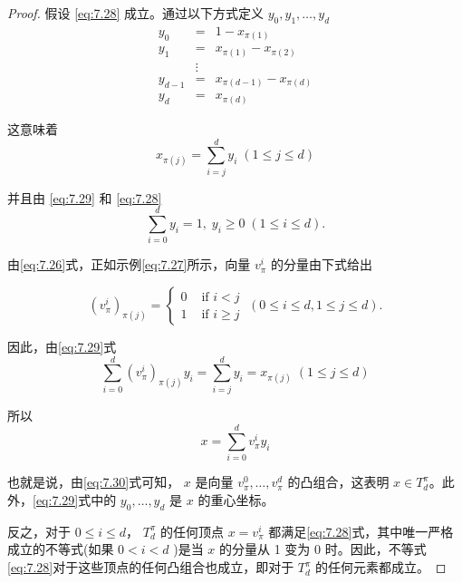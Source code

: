 \begin{proof}
假设 \eqref{eq:7.28} 成立。通过以下方式定义 \({y}_{0},{y}_{1},\ldots,{y}_{d}\)
\begin{eqnarray}
{y}_{0} &=& 1 - {x}_{\pi \left( 1\right) }\nonumber\\
{y}_{1}& =& {x}_{\pi \left( 1\right) } - {x}_{\pi \left( 2\right) }\nonumber\\
&\vdots&\label{eq:7.29}\\
{y}_{d - 1} &=& {x}_{\pi \left( {d - 1}\right) } - {x}_{\pi \left( d\right) }\nonumber\\
{y}_{d} &=& {x}_{\pi \left( d\right) }\nonumber
\end{eqnarray}

这意味着
\[
{x}_{\pi \left( j\right) } = \mathop{\sum }\limits_{{i = j}}^{d}{y}_{i}\;\left( {1 \leq  j \leq  d}\right)
\]

并且由 \eqref{eq:7.29} 和 \eqref{eq:7.28}
\begin{equation}
\mathop{\sum }\limits_{{i = 0}}^{d}{y}_{i} = 1,\;{y}_{i} \geq  0\;\left( {1 \leq  i \leq  d}\right) .\label{eq:7.30}
\end{equation}

由\eqref{eq:7.26}式，正如示例\eqref{eq:7.27}所示，向量 \({v}_{\pi }^{i}\) 的分量由下式给出

\[
{\left( {v}_{\pi }^{i}\right) }_{\pi \left( j\right) } = \left\{  {\begin{array}{ll} 0 & \text{ if }i < j \\  1 & \text{ if }i \geq  j \end{array}\;\left( {0 \leq  i \leq  d,1 \leq  j \leq  d}\right) .}\right.
\]

因此，由\eqref{eq:7.29}式
\[
\mathop{\sum }\limits_{{i = 0}}^{d}{\left( {v}_{\pi }^{i}\right) }_{\pi \left( j\right) }{y}_{i} = \mathop{\sum }\limits_{{i = j}}^{d}{y}_{i} = {x}_{\pi \left( j\right) }\;\left( {1 \leq  j \leq  d}\right)
\]

所以
\begin{equation}
x = \mathop{\sum }\limits_{{i = 0}}^{d}{v}_{\pi }^{i}{y}_{i}\label{eq:7.31}
\end{equation}

也就是说，由\eqref{eq:7.30}式可知， \(x\) 是向量 \({v}_{\pi }^{0},\ldots,{v}_{\pi }^{d}\) 的凸组合，这表明 \(x \in  {T}_{d}^{\pi }\)。此外，\eqref{eq:7.29}式中的 \({y}_{0},\ldots,{y}_{d}\) 是 \(x\) 的重心坐标。

反之，对于 \(0 \leq  i \leq  d\)， \({T}_{d}^{\pi }\) 的任何顶点 \(x = {v}_{\pi }^{i}\) 都满足\eqref{eq:7.28}式，其中唯一严格成立的不等式(如果 \(0 < i < d\) )是当 \(x\) 的分量从 1 变为 0 时。因此，不等式\eqref{eq:7.28}对于这些顶点的任何凸组合也成立，即对于 \({T}_{d}^{\pi }\) 的任何元素都成立。
\end{proof}
\bigskip

